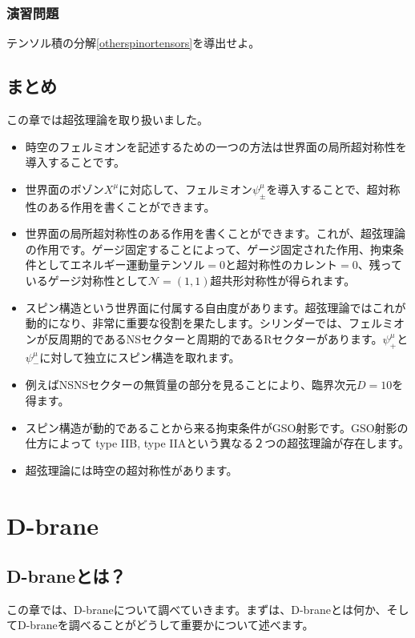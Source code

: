 \documentclass[report,paper=a4, fontsize=12pt, line_length=16cm, number_of_lines=33,dvipdfmx]{jlreq}
\numberwithin{equation}{chapter}
\numberwithin{equation}{section}
\newcommand{\Ncal}{\mathcal{N}}
\begin{document}
\subsection*{演習問題}
テンソル積の分解\eqref{otherspinortensors}を導出せよ。

\section{まとめ}

この章では超弦理論を取り扱いました。
\begin{itemize}
  \item 時空のフェルミオンを記述するための一つの方法は世界面の局所超対称性を導入することです。
  \item 世界面のボゾン$X^{\mu}$に対応して、フェルミオン$\psi_{\pm}^{\mu}$を導入することで、超対称性のある作用を書くことができます。
  \item 世界面の局所超対称性のある作用を書くことができます。これが、超弦理論の作用です。ゲージ固定することによって、ゲージ固定された作用、拘束条件としてエネルギー運動量テンソル$=0$と超対称性のカレント$=0$、残っているゲージ対称性として$\Ncal=(1,1)$超共形対称性が得られます。
  \item スピン構造という世界面に付属する自由度があります。超弦理論ではこれが動的になり、非常に重要な役割を果たします。シリンダーでは、フェルミオンが反周期的であるNSセクターと周期的であるRセクターがあります。$\psi^{\mu}_{+}$と$\psi^{\mu}_{-}$に対して独立にスピン構造を取れます。
  \item 例えばNSNSセクターの無質量の部分を見ることにより、臨界次元$D=10$を得ます。
  \item スピン構造が動的であることから来る拘束条件がGSO射影です。GSO射影の仕方によって type IIB, type IIAという異なる２つの超弦理論が存在します。
  \item 超弦理論には時空の超対称性があります。
\end{itemize}


\chapter{D-brane}

\section{D-braneとは？}

この章では、D-braneについて調べていきます。まずは、D-braneとは何か、そしてD-braneを調べることがどうして重要かについて述べます。
\end{document}
